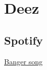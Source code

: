 \chapter{Deez}

\section{Spotify}

\href{https://open.spotify.com/track/0FNLnZRNWEIbGsb8jkU2lv}{Banger song}
